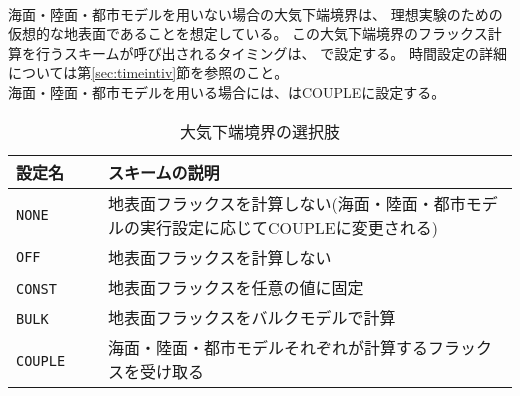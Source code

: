 \\


海面・陸面・都市モデルを用いない場合の大気下端境界は、
理想実験のための仮想的な地表面であることを想定している。
この大気下端境界のフラックス計算を行うスキームが呼び出されるタイミングは、
で設定する。
時間設定の詳細については第\ref{sec:timeintiv}節を参照のこと。\\

海面・陸面・都市モデルを用いる場合には、はCOUPLEに設定する。


\begin{table}[h]
\begin{center}
  \caption{大気下端境界の選択肢}
  \label{tab:nml_atm_sf}
  \begin{tabularx}{150mm}{lX} \hline
    \rowcolor[gray]{0.9}  設定名 & スキームの説明\\ \hline
      \verb|NONE|         & 地表面フラックスを計算しない(海面・陸面・都市モデルの実行設定に応じてCOUPLEに変更される) \\
      \verb|OFF|          & 地表面フラックスを計算しない \\
      \verb|CONST|   　　　& 地表面フラックスを任意の値に固定 \\
      \verb|BULK|    　　　& 地表面フラックスをバルクモデルで計算 \\
      \verb|COUPLE|  　　　& 海面・陸面・都市モデルそれぞれが計算するフラックスを受け取る \\
    \hline
  \end{tabularx}
\end{center}
\end{table}

